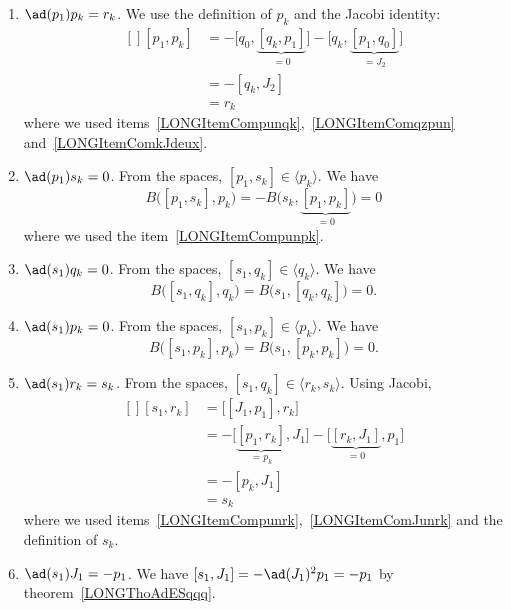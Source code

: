 \begin{enumerate}
	\item$\ad(p_1)p_k=r_k$\label{LONGItemCompunpk}. We use the definition of $p_k$ and the Jacobi identity:
		\begin{equation}
			\begin{aligned}[]
				[p_1,p_k]&=-\big[ q_0,\underbrace{[q_k,p_1]}_{=0} \big]-\big[ q_k,\underbrace{[p_1,q_0]}_{=J_2} \big]\\
					&=-[q_k,J_2]\\
					&=r_k
			\end{aligned}
		\end{equation}
		where we used items~\ref{LONGItemCompunqk},~\ref{LONGItemComqzpun} and~\ref{LONGItemComkJdeux}.
	\item$\ad(p_1)s_k=0$. From the spaces, $[p_1,s_k]\in\langle p_k\rangle$. We have
		\begin{equation}
			B\big( [p_1,s_k],p_k \big)=-B\big( s_k,\underbrace{[p_1,p_k]}_{=0} \big)=0
		\end{equation}
		where we used the item~\ref{LONGItemCompunpk}.
	\item$\ad(s_1)q_k=0$. From the spaces, $[s_1,q_k]\in\langle q_k\rangle$. We have
		\begin{equation}
			B\big( [s_1,q_k],q_k \big)=B\big( s_1,[q_k,q_k] \big)=0.
		\end{equation}
	\item$\ad(s_1)p_k=0$\label{LONGItemComsunpk}. From the spaces, $[s_1,p_k]\in\langle p_k\rangle$. We have
		\begin{equation}
			B\big( [s_1,p_k],p_k \big)=B\big( s_1,[p_k,p_k] \big)=0.
		\end{equation}
	\item$\ad(s_1)r_k=s_k$. From the spaces, $[s_1,q_k]\in\langle r_k,s_k\rangle$. Using Jacobi,
		\begin{equation}
			\begin{aligned}[]
				[s_1,r_k]&=\big[ [J_1,p_1],r_k \big]\\
				&=-\big[ \underbrace{[p_1,r_k]}_{=p_k},J_1 \big]-\big[ \underbrace{[r_k,J_1]}_{=0},p_1 \big]\\
					&=-[p_k,J_1]\\
					&=s_k
			\end{aligned}
		\end{equation}
		where we used items~\ref{LONGItemCompunrk},~\ref{LONGItemComJunrk} and the definition of $s_k$.
	\item$\ad(s_1)J_1=-p_1$\label{LONGItemComsunJun}. We have $[s_1,J_1]=-\ad(J_1)^2p_1=-p_1$ by theorem~\ref{LONGThoAdESqqq}.

\end{enumerate}
